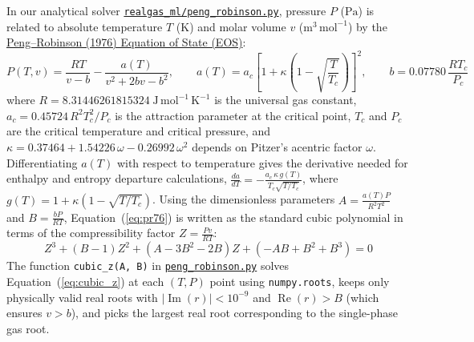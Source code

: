 \documentclass[10pt,a4paper]{article}
\begin{document}
In our analytical solver \href{https://github.com/satwikgupta122/realgas_ml/blob/main/realgas_ml/peng_robinson.py}{\texttt{realgas\_ml/peng\_robinson.py}}, pressure $P$ ($\mathrm{Pa}$) is related to absolute temperature $T$ ($\mathrm{K}$) and molar volume $v$ ($\mathrm{m^3\,mol^{-1}}$) by the \href{https://doi.org/10.1021/i160057a011}{Peng--Robinson (1976) Equation of State (EOS)}:
\begin{equation}
P(T,v) = \frac{RT}{v - b} - \frac{a(T)}{v^2 + 2bv - b^2}, \qquad a(T) = a_c\left[1 + \kappa\left(1 - \sqrt{\frac{T}{T_c}}\right)\right]^2, \qquad b = 0.07780\,\frac{RT_c}{P_c}
\label{eq:pr76}
\end{equation}
where $R = 8.31446261815324\;\mathrm{J\,mol^{-1}\,K^{-1}}$ is the universal gas constant, $a_c = 0.45724\,R^2T_c^2/P_c$ is the attraction parameter at the critical point, $T_c$ and $P_c$ are the critical temperature and critical pressure, and $\kappa = 0.37464 + 1.54226\,\omega - 0.26992\,\omega^2$ depends on Pitzer's acentric factor $\omega$. Differentiating $a(T)$ with respect to temperature gives the derivative needed for enthalpy and entropy departure calculations, $\frac{da}{dT} = -\frac{a_c\,\kappa\,g(T)}{T_c\sqrt{T/T_c}}$, where $g(T) = 1 + \kappa(1 - \sqrt{T/T_c})$. Using the dimensionless parameters $A = \frac{a(T)P}{R^2T^2}$ and $B = \frac{bP}{RT}$, Equation~(\ref{eq:pr76}) is written as the standard cubic polynomial in terms of the compressibility factor $Z = \frac{Pv}{RT}$:
\begin{equation}
Z^3 + (B - 1)Z^2 + (A - 3B^2 - 2B)Z + (-AB + B^2 + B^3) = 0
\label{eq:cubic_z}
\end{equation}
The function \texttt{cubic\_z(A, B)} in \href{https://github.com/satwikgupta122/realgas_ml/blob/main/realgas_ml/peng_robinson.py}{\texttt{peng\_robinson.py}} solves Equation~(\ref{eq:cubic_z}) at each $(T,P)$ point using \texttt{numpy.roots}, keeps only physically valid real roots with $|\operatorname{Im}(r)| < 10^{-9}$ and $\operatorname{Re}(r) > B$ (which ensures $v > b$), and picks the largest real root corresponding to the single-phase gas root.
\end{document}
